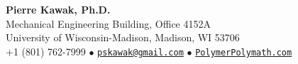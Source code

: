 \documentclass[letterpaper,11pt]{article}
\def\name{Pierre Kawak, Ph.D.}
\begin{document}


\begin{center}
  {\LARGE \textbf{Pierre Kawak, Ph.D.} }\\[1ex]
  Mechanical Engineering Building, Office 4152A \\
  University of Wisconsin-Madison, Madison, WI 53706 \\
  +1 (801) 762-7999 $\bullet$ \href{mailto:pskawak@gmail.com}{\tt pskawak@gmail.com} $\bullet$ \href{https://www.polymerpolymath.com}{\tt PolymerPolymath.com} \\ 
\end{center}

\end{document}
